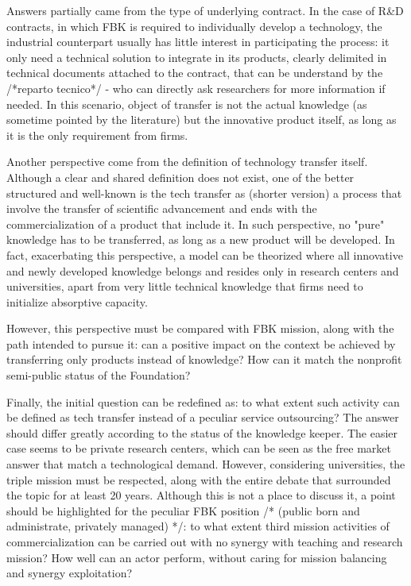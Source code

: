 Answers partially came from the type of underlying contract. In the case of R\&D contracts, in which FBK is required to individually develop a technology, the industrial counterpart usually has little interest in participating the process: it only need a technical solution to integrate in its products, clearly delimited in technical documents attached to the contract, that can be understand by the /*reparto tecnico*/ - who can directly ask researchers for more information if needed. In this scenario, object of transfer is not the actual knowledge (as sometime pointed by the literature) but the innovative product itself, as long as it is the only requirement from firms.

Another perspective come from the definition of technology transfer itself. Although a clear and shared definition does not exist, one of the better structured and well-known is the tech transfer as (shorter version) a process that involve the transfer of scientific advancement and ends with the commercialization of a product that include it. In such perspective, no "pure" knowledge has to be transferred, as long as a new product will be developed. In fact, exacerbating this perspective, a model can be theorized where all innovative and newly developed knowledge belongs and resides only in research centers and universities, apart from very little technical knowledge that firms need to initialize absorptive capacity. 

However, this perspective must be compared with FBK mission, along with the path intended to pursue it: can a positive impact on the context be achieved by transferring only products instead of knowledge? How can it match the nonprofit semi-public status of the Foundation? 

Finally, the initial question can be redefined as: to what extent such activity can be defined as tech transfer instead of a peculiar service outsourcing? The answer should differ greatly according to the status of the knowledge keeper. The easier case seems to be private research centers, which can be seen as the free market answer that match a technological demand. However, considering universities, the triple mission must be respected, along with the entire debate that surrounded the topic for at least 20 years. Although this is not a place to discuss it, a point should be highlighted for the peculiar FBK position /* (public born and administrate, privately managed) */: to what extent third mission activities of commercialization can be carried out with no synergy with teaching and research mission? How well can an actor perform, without caring for mission balancing and synergy exploitation?

